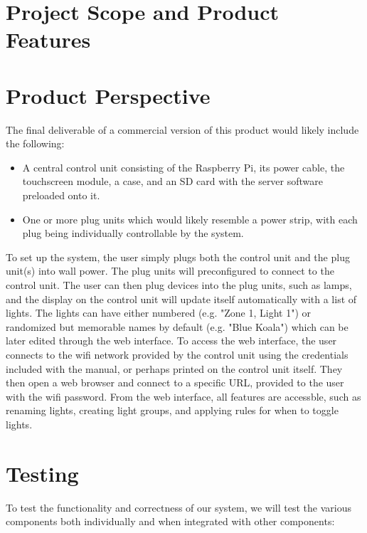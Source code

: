 \documentclass[oneside,openright]{scrreprt}
\begin{document}
\section{Project Scope and Product Features}

\section{Product Perspective}

The final deliverable of a commercial version of this product would likely include the following:

\begin{itemize}
    \item A central control unit consisting of the Raspberry Pi, its power
cable, the touchscreen module, a case, and an SD card with the server software
preloaded onto it.
    \item One or more plug units which would likely resemble a power strip,
with each plug being individually controllable by the system.
\end{itemize}

To set up the system, the user simply plugs both the control unit and the plug
unit(s) into wall power.  The plug units will preconfigured to connect to the
control unit.  The user can then plug devices into the plug units, such as
lamps, and the display on the control unit will update itself automatically
with a list of lights.  The lights can have either numbered (e.g. "Zone 1,
Light 1") or randomized but memorable names by default (e.g. "Blue Koala")
which can be later edited through the web interface.  To access the web
interface, the user connects to the wifi network provided by the control unit
using the credentials included with the manual, or perhaps printed on the
control unit itself.  They then open a web browser and connect to a specific
URL, provided to the user with the wifi password.  From the web interface, all
features are accessble, such as renaming lights, creating light groups, and
applying rules for when to toggle lights.

\section{Testing}

To test the functionality and correctness of our system, we will test the various components both individually and when integrated with other components:
\end{document}
